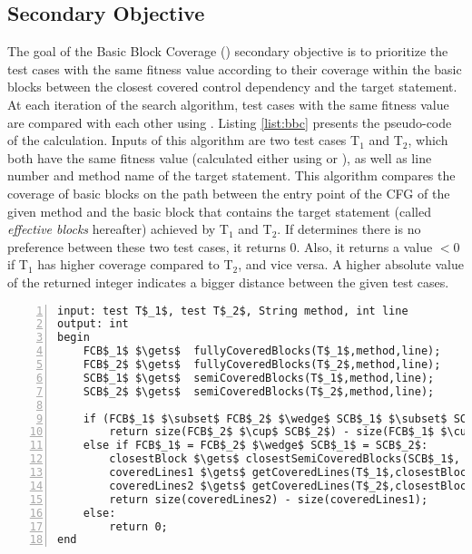 \subsection{Secondary Objective}

The goal of the Basic Block Coverage (\bbc) secondary objective is to prioritize the test cases with the same fitness value according to their coverage within the basic blocks between the closest covered control dependency and the target statement. At each iteration of the search algorithm, test cases with the same fitness value are compared with each other using \bbc. Listing \ref{list:bbc} presents the pseudo-code of the \bbc calculation. Inputs of this algorithm are two test cases T$_1$ and T$_2$, which both have the same fitness value (calculated either using \WS or \integ), as well as line number and method name of the target statement. This algorithm compares the coverage of basic blocks on the path between the entry point of the CFG of the given method and the basic block that contains the target statement (called \textit{effective blocks} hereafter) achieved by  T$_1$ and T$_2$. If \bbc determines there is no preference between these two test cases, it returns 0. Also, it returns a value $<0$ if T$_1$ has higher coverage compared to T$_2$, and vice versa. A higher absolute value of the returned integer indicates a bigger distance between the given test cases.

\begin{lstlisting}[float=t,
    caption={\bbc secondary objective computation algorithm},
    label=list:bbc,
    mathescape=true,
    frame=tb,
    numbers=left, 
    numberstyle=\tiny,
    belowskip=-2.5em,
    keywordstyle=\bfseries\em,
    keywords={,input, output, return, datatype, function, in, if, else, foreach, while, begin, end, } %add the keywords you want, or load a language as Rubens explains in his comment above.
    numbers=left,
    xleftmargin=.04\textwidth]
input: test T$_1$, test T$_2$, String method, int line
output: int
begin
    FCB$_1$ $\gets$  fullyCoveredBlocks(T$_1$,method,line);
    FCB$_2$ $\gets$  fullyCoveredBlocks(T$_2$,method,line);
    SCB$_1$ $\gets$  semiCoveredBlocks(T$_1$,method,line);
    SCB$_2$ $\gets$  semiCoveredBlocks(T$_2$,method,line);

    if (FCB$_1$ $\subset$ FCB$_2$ $\wedge$ SCB$_1$ $\subset$ SCB$_2$) $\vee$ (FCB$_2$ $\subset$ FCB$_1$ $\wedge$ SCB$_2$ $\subset$ SCB$_1$):
        return size(FCB$_2$ $\cup$ SCB$_2$) - size(FCB$_1$ $\cup$ SCB$_1$)
    else if FCB$_1$ = FCB$_2$ $\wedge$ SCB$_1$ = SCB$_2$:
        closestBlock $\gets$ closestSemiCoveredBlocks(SCB$_1$, method, line);
        coveredLines1 $\gets$ getCoveredLines(T$_1$,closestBlock);
        coveredLines2 $\gets$ getCoveredLines(T$_2$,closestBlock);
        return size(coveredLines2) - size(coveredLines1);      
    else:
        return 0;
end  
  \end{lstlisting}



